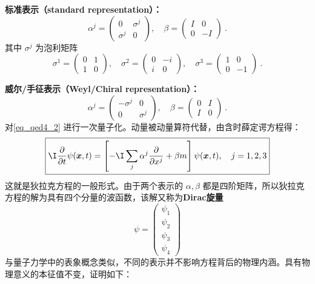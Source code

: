 \textbf{标准表示（standard representation）：}
\begin{equation}\label{eq_qed4_6}
\alpha^{j}=\left(\begin{array}{cc}
0 & \sigma^{j} \\
\sigma^{j} & 0
\end{array}\right), \quad \beta=\left(\begin{array}{rr}
I & 0 \\
0 & -I
\end{array}\right)~.
\end{equation}
其中 $\sigma^{j}$ 为泡利矩阵
\begin{equation}\label{eq_qed4_7}
\sigma^{1}=\left(\begin{array}{ll}
0 & 1 \\
1 & 0
\end{array}\right), \quad \sigma^{2}=\left(\begin{array}{rr}
0 & -i \\
i & 0
\end{array}\right), \quad \sigma^{3}=\left(\begin{array}{rr}
1 & 0 \\
0 & -1
\end{array}\right)~.
\end{equation}

\textbf{威尔/手征表示（Weyl/Chiral representation）：}
\begin{equation}\label{eq_qed4_8}
\alpha^{j}=\left(\begin{array}{cc}
-\sigma^{j} & 0 \\
0 & \sigma^{j}
\end{array}\right), \quad \beta=\left(\begin{array}{cc}
0 & I \\
I & 0
\end{array}\right)~.
\end{equation}
对\autoref{eq_qed4_2} 进行一次量子化。动量被动量算符代替，由含时薛定谔方程得：\begin{equation}\label{eq_qed4_9}
\boxed{ \I \frac{\partial}{\partial t} \psi(\boldsymbol{x}, t)=\left[- \I \sum_{j} \alpha^{j} \frac{\partial}{\partial x^{j}}+\beta m\right] \psi(\boldsymbol{x}, t), \quad j=1,2,3}
\end{equation}
这就是狄拉克方程的一般形式。由于两个表示的 $\alpha,\beta$ 都是四阶矩阵，所以狄拉克方程的解为具有四个分量的波函数，该解又称为\textbf{Dirac旋量}
\begin{equation}\label{eq_qed4_10}
\psi=\left(\begin{array}{l}
\psi_{1} \\
\psi_{2} \\
\psi_{3} \\
\psi_{4}
\end{array}\right)
\end{equation}
与量子力学中的表象概念类似，不同的表示并不影响方程背后的物理内涵。具有物理意义的本征值不变，证明如下：

